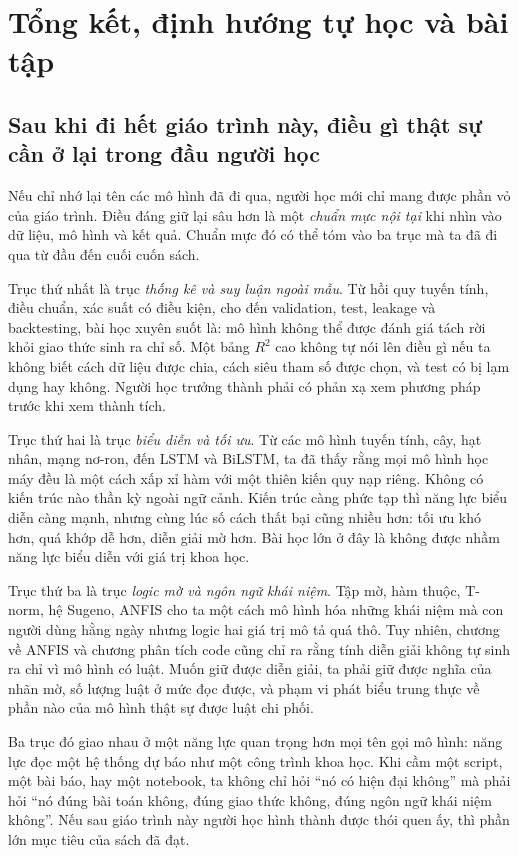 \chapter{Tổng kết, định hướng tự học và bài tập}

\section{Sau khi đi hết giáo trình này, điều gì thật sự cần ở lại trong đầu người học}

Nếu chỉ nhớ lại tên các mô hình đã đi qua, người học mới chỉ mang được phần vỏ của giáo trình. Điều đáng giữ lại sâu hơn là một \emph{chuẩn mực nội tại} khi nhìn vào dữ liệu, mô hình và kết quả. Chuẩn mực đó có thể tóm vào ba trục mà ta đã đi qua từ đầu đến cuối cuốn sách.

Trục thứ nhất là trục \emph{thống kê và suy luận ngoài mẫu}. Từ hồi quy tuyến tính, điều chuẩn, xác suất có điều kiện, cho đến validation, test, leakage và backtesting, bài học xuyên suốt là: mô hình không thể được đánh giá tách rời khỏi giao thức sinh ra chỉ số. Một bảng \(R^2\) cao không tự nói lên điều gì nếu ta không biết cách dữ liệu được chia, cách siêu tham số được chọn, và test có bị lạm dụng hay không. Người học trưởng thành phải có phản xạ xem phương pháp trước khi xem thành tích.

Trục thứ hai là trục \emph{biểu diễn và tối ưu}. Từ các mô hình tuyến tính, cây, hạt nhân, mạng nơ-ron, đến LSTM và BiLSTM, ta đã thấy rằng mọi mô hình học máy đều là một cách xấp xỉ hàm với một thiên kiến quy nạp riêng. Không có kiến trúc nào thần kỳ ngoài ngữ cảnh. Kiến trúc càng phức tạp thì năng lực biểu diễn càng mạnh, nhưng cùng lúc số cách thất bại cũng nhiều hơn: tối ưu khó hơn, quá khớp dễ hơn, diễn giải mờ hơn. Bài học lớn ở đây là không được nhầm năng lực biểu diễn với giá trị khoa học.

Trục thứ ba là trục \emph{logic mờ và ngôn ngữ khái niệm}. Tập mờ, hàm thuộc, T-norm, hệ Sugeno, ANFIS cho ta một cách mô hình hóa những khái niệm mà con người dùng hằng ngày nhưng logic hai giá trị mô tả quá thô. Tuy nhiên, chương về ANFIS và chương phân tích code cũng chỉ ra rằng tính diễn giải không tự sinh ra chỉ vì mô hình có luật. Muốn giữ được diễn giải, ta phải giữ được nghĩa của nhãn mờ, số lượng luật ở mức đọc được, và phạm vi phát biểu trung thực về phần nào của mô hình thật sự được luật chi phối.

Ba trục đó giao nhau ở một năng lực quan trọng hơn mọi tên gọi mô hình: năng lực đọc một hệ thống dự báo như một công trình khoa học. Khi cầm một script, một bài báo, hay một notebook, ta không chỉ hỏi ``nó có hiện đại không'' mà phải hỏi ``nó đúng bài toán không, đúng giao thức không, đúng ngôn ngữ khái niệm không''. Nếu sau giáo trình này người học hình thành được thói quen ấy, thì phần lớn mục tiêu của sách đã đạt.

